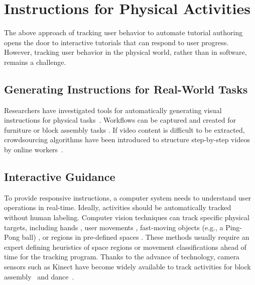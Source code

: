 


\section{Instructions for Physical Activities}
\label{related_physical}

The above approach of tracking user behavior to automate tutorial authoring opens the door to interactive tutorials that can respond to user progress. However, tracking user behavior in the physical world, rather than in software, remains a challenge.

\subsection{Generating Instructions for Real-World Tasks}
Researchers have investigated tools for automatically generating visual instructions for physical tasks~\cite{feiner:1985:AEA:1299975.1300548,Seligmann:1991:AGI:127719.122732}. Workflows can be captured and created for furniture \cite{agrawala2003designing} or block assembly tasks \cite{Gupta:2012ku}.
%
If video content is difficult to be extracted, crowdsourcing algorithms have been introduced to structure step-by-step videos by online workers~\cite{Kim:2014:CSI:2611222.2556986}.
%

\subsection{Interactive Guidance}
To provide responsive instructions, a computer system needs to understand user operations in real-time. Ideally, activities should be automatically tracked without human labeling.
%
Computer vision techniques can track specific physical targets, including hands \cite{Ranjan:2008}, user movements \cite{Wilson:2012fb}, fast-moving objects (e.g., a Ping-Pong ball) \cite{Okumura:2011tr}, or regions in pre-defined spaces \cite{Ranjan:2007}.
%
These methods usually require an expert defining heuristics of space regions or movement classifications ahead of time for the tracking program.
%
Thanks to the advance of technology, camera sensors such as Kinect have become widely available to track activities for block assembly~\cite{Gupta:2012ku} and dance~\cite{Anderson:2013:YEM:2501988.2502045}.

